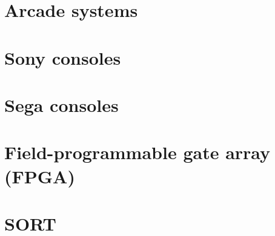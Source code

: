 \documentclass[oneside]{book}
\begin{document}
\part{Arcade systems}

\part{Sony consoles}

\part{Sega consoles}

\part{Field-programmable gate array (FPGA)}

\part{SORT}

\end{document}
